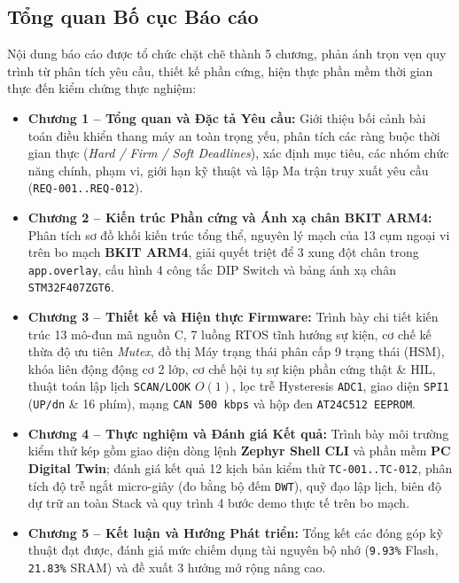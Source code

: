 \subsection{Tổng quan Bố cục Báo cáo}
Nội dung báo cáo được tổ chức chặt chẽ thành 5 chương, phản ánh trọn vẹn quy trình từ phân tích yêu cầu, thiết kế phần cứng, hiện thực phần mềm thời gian thực đến kiểm chứng thực nghiệm:
\begin{itemize}[nosep]
    \item \textbf{Chương 1 -- Tổng quan và Đặc tả Yêu cầu:} Giới thiệu bối cảnh bài toán điều khiển thang máy an toàn trọng yếu, phân tích các ràng buộc thời gian thực (\textit{Hard / Firm / Soft Deadlines}), xác định mục tiêu, các nhóm chức năng chính, phạm vi, giới hạn kỹ thuật và lập Ma trận truy xuất yêu cầu (\texttt{REQ-001..REQ-012}).
    \item \textbf{Chương 2 -- Kiến trúc Phần cứng và Ánh xạ chân BKIT ARM4:} Phân tích sơ đồ khối kiến trúc tổng thể, nguyên lý mạch của 13 cụm ngoại vi trên bo mạch \textbf{BKIT ARM4}, giải quyết triệt để 3 xung đột chân trong \texttt{app.overlay}, cấu hình 4 công tắc DIP Switch và bảng ánh xạ chân \texttt{STM32F407ZGT6}.
    \item \textbf{Chương 3 -- Thiết kế và Hiện thực Firmware:} Trình bày chi tiết kiến trúc 13 mô-đun mã nguồn C, 7 luồng RTOS tĩnh hướng sự kiện, cơ chế kế thừa độ ưu tiên \textit{Mutex}, đồ thị Máy trạng thái phân cấp 9 trạng thái (HSM), khóa liên động động cơ 2 lớp, cơ chế hội tụ sự kiện phần cứng thật \& HIL, thuật toán lập lịch \texttt{SCAN/LOOK} $O(1)$, lọc trễ Hysteresis \texttt{ADC1}, giao diện \texttt{SPI1} (\texttt{UP/dn} \& 16 phím), mạng \texttt{CAN 500 kbps} và hộp đen \texttt{AT24C512 EEPROM}.
    \item \textbf{Chương 4 -- Thực nghiệm và Đánh giá Kết quả:} Trình bày môi trường kiểm thử kép gồm giao diện dòng lệnh \textbf{Zephyr Shell CLI} và phần mềm \textbf{PC Digital Twin}; đánh giá kết quả 12 kịch bản kiểm thử \texttt{TC-001..TC-012}, phân tích độ trễ ngắt micro-giây (đo bằng bộ đếm \texttt{DWT}), quỹ đạo lập lịch, biên độ dự trữ an toàn Stack và quy trình 4 bước demo thực tế trên bo mạch.
    \item \textbf{Chương 5 -- Kết luận và Hướng Phát triển:} Tổng kết các đóng góp kỹ thuật đạt được, đánh giá mức chiếm dụng tài nguyên bộ nhớ (\texttt{9.93\%} Flash, \texttt{21.83\%} SRAM) và đề xuất 3 hướng mở rộng nâng cao.
\end{itemize}
